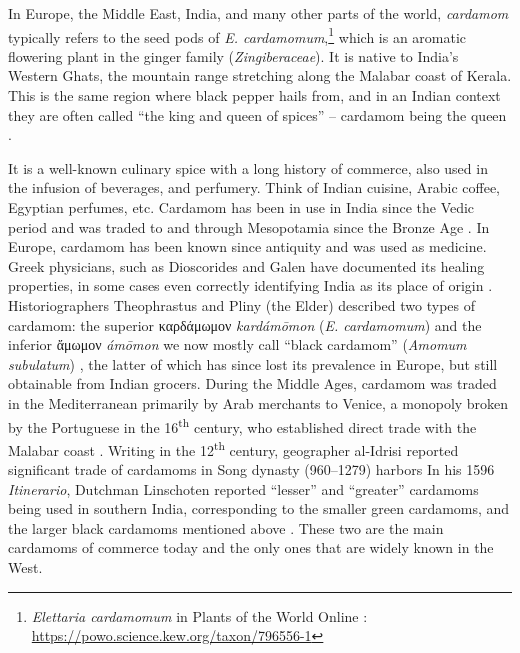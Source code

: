 \documentclass[12pt]{article}
\begin{document}

In Europe, the Middle East, India, and many other parts of the world, \textit{cardamom} typically refers to the seed pods of \textit{E. cardamomum},\footnote{\textit{Elettaria cardamomum} in Plants of the World Online \parencite{powo}: \url{https://powo.science.kew.org/taxon/796556-1}} which is an aromatic flowering plant in the ginger family (\textit{Zingiberaceae}). It is native to India's Western Ghats, the mountain range stretching along the Malabar coast of Kerala. This is the same region where black pepper hails from, and in an Indian context they are often called ``the king and queen of spices'' -- cardamom being the queen \parencite{nair_2011_agronomy}. 

It is a well-known culinary spice with a long history of commerce, also used in the infusion of beverages, and perfumery. Think of Indian cuisine, Arabic coffee, Egyptian perfumes, etc. Cardamom has been in use in India since the Vedic period and was traded to and through Mesopotamia since the Bronze Age \parencite{ravindran_2002_cardamom}. In Europe, cardamom has been known since antiquity and was used as medicine. Greek physicians, such as Dioscorides and Galen have documented its healing properties, in some cases even correctly identifying India as its place of origin \parencites{parry_1969_spices}{anderson_2023_history}. Historiographers Theophrastus and Pliny (the Elder) described two types of cardamom: the superior καρδάμωμον \textit{kardámōmon} (\textit{E. cardamomum}) and the inferior ἄμωμον \textit{ámōmon} we now mostly call ``black cardamom'' (\textit{Amomum subulatum}) \parencite{prance_2005_cultural}, the latter of which has since lost its prevalence in Europe, but still obtainable from Indian grocers. During the Middle Ages, cardamom was traded in the Mediterranean primarily by Arab merchants to Venice, a monopoly broken by the Portuguese in the 16\textsuperscript{th} century, who established direct trade with the Malabar coast \parencite{cumo_2013_encyclopedia}. Writing in the 12\textsuperscript{th} century, geographer al-Idrisi reported significant trade of cardamoms in Song dynasty (960--1279) harbors \parencite{prance_2005_cultural}In his 1596 \textit{Itinerario}, Dutchman Linschoten reported ``lesser'' and ``greater'' cardamoms being used in southern India, corresponding to the smaller green cardamoms, and the larger black cardamoms mentioned above \parencite{nair_2020_geography}. These two are the main cardamoms of commerce today and the only ones that are widely known in the West.
\end{document}
